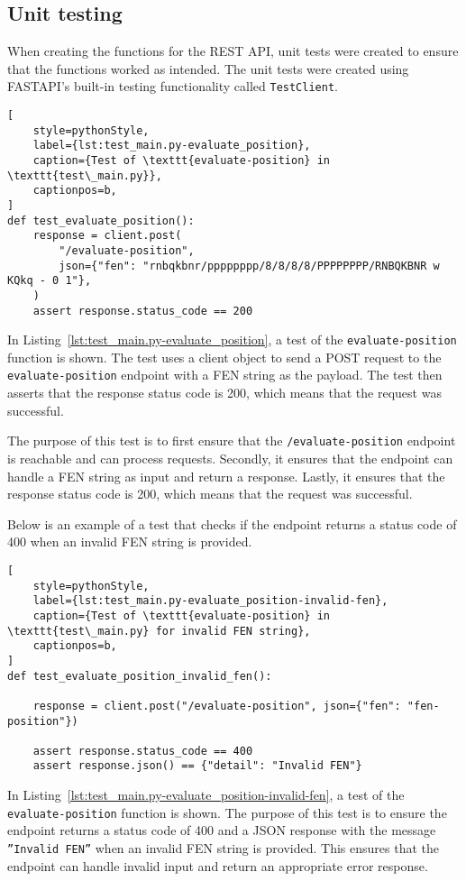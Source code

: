 \subsection{Unit testing}\label{subsec:unit-testing}
When creating the functions for the REST API, unit tests were created to ensure that the functions worked as intended.
The unit tests were created using FASTAPI's built-in testing functionality called \texttt{TestClient}.

\begin{lstlisting}[
    style=pythonStyle,
    label={lst:test_main.py-evaluate_position},
    caption={Test of \texttt{evaluate-position} in \texttt{test\_main.py}},
    captionpos=b,
]
def test_evaluate_position():
    response = client.post(
        "/evaluate-position",
        json={"fen": "rnbqkbnr/pppppppp/8/8/8/8/PPPPPPPP/RNBQKBNR w KQkq - 0 1"},
    )
    assert response.status_code == 200
\end{lstlisting}

In Listing~\ref{lst:test_main.py-evaluate_position}, a test of the \texttt{evaluate-position} function is shown.
The test uses a client object to send a POST request to the \texttt{evaluate-position} endpoint with a FEN string as
the payload.
The test then asserts that the response status code is 200, which means that the request was successful.

The purpose of this test is to first ensure that the \texttt{/evaluate-position} endpoint is reachable and can process
requests.
Secondly, it ensures that the endpoint can handle a FEN string as input and return a response.
Lastly, it ensures that the response status code is 200, which means that the request was successful.

\pagebreak

Below is an example of a test that checks if the endpoint returns a status code of 400 when an invalid FEN
string is provided.

\begin{lstlisting}[
    style=pythonStyle,
    label={lst:test_main.py-evaluate_position-invalid-fen},
    caption={Test of \texttt{evaluate-position} in \texttt{test\_main.py} for invalid FEN string},
    captionpos=b,
]
def test_evaluate_position_invalid_fen():

    response = client.post("/evaluate-position", json={"fen": "fen-position"})

    assert response.status_code == 400
    assert response.json() == {"detail": "Invalid FEN"}
\end{lstlisting}

In Listing~\ref{lst:test_main.py-evaluate_position-invalid-fen}, a test of the \texttt{evaluate-position} function is
shown.
The purpose of this test is to ensure the endpoint returns a status code of 400 and a JSON response with the
message \texttt{''Invalid FEN''} when an invalid FEN string is provided.
This ensures that the endpoint can handle invalid input and return an appropriate error response.
